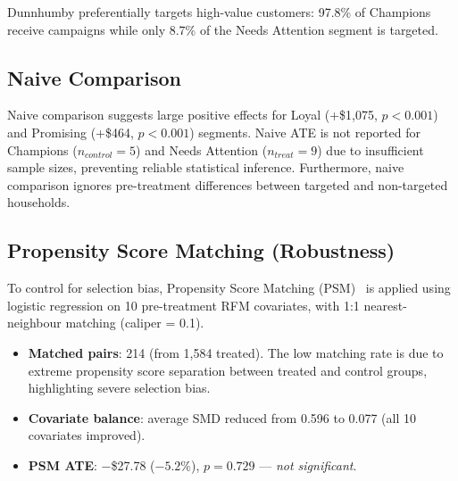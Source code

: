 \documentclass[conference]{IEEEtran}
\begin{document}
Dunnhumby preferentially targets high-value customers:
97.8\% of Champions receive campaigns while only 8.7\% of the
Needs Attention segment is targeted.

\subsection{Naive Comparison}

\begin{table}[H]
\centering
\caption{Segment-stratified experiment results (Welch $t$-test,
         Bootstrap 95\% CI).}
\label{tab:ab}
\end{table}

Naive comparison suggests large positive effects for Loyal
(+\$1{,}075, $p < 0.001$) and Promising (+\$464, $p < 0.001$)
segments. Naive ATE is not reported for Champions ($n_{control}=5$) and Needs Attention ($n_{treat}=9$) due to insufficient sample sizes, preventing reliable statistical inference. Furthermore, naive comparison ignores pre-treatment differences between
targeted and non-targeted households.

\subsection{Propensity Score Matching (Robustness)}

To control for selection bias, Propensity Score Matching (PSM)~\cite{rosenbaum1983} is
applied using logistic regression on 10 pre-treatment RFM
covariates, with 1:1 nearest-neighbour matching (caliper = 0.1).

\begin{itemize}
  \item \textbf{Matched pairs}: 214 (from 1{,}584 treated). The low matching rate is due to extreme propensity score separation between treated and control groups, highlighting severe selection bias.
  \item \textbf{Covariate balance}: average SMD reduced from 0.596
        to 0.077 (all 10 covariates improved).
  \item \textbf{PSM ATE}: $-$\$27.78 ($-5.2\%$), $p = 0.729$
        --- \emph{not significant}.
\end{itemize}
\end{document}

